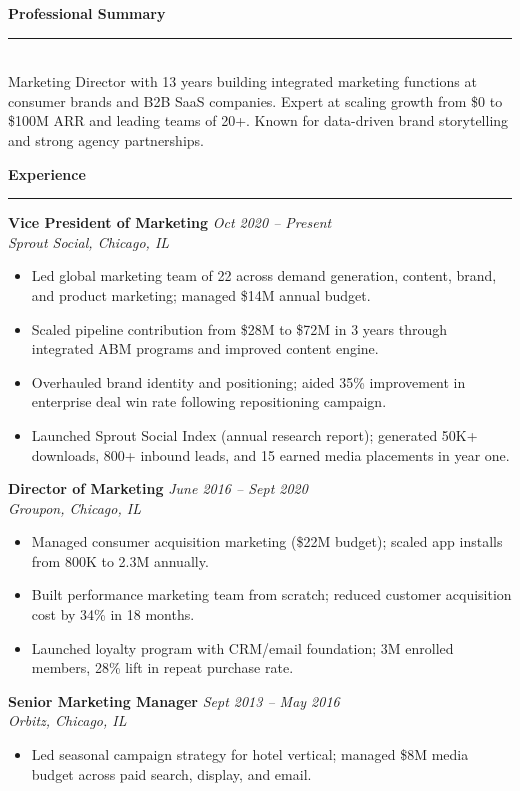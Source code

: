 \documentclass[11pt,a4paper]{article}
\begin{document}
\begin{minipage}[t]{0.62\textwidth}

\vspace{2pt}
{\large\textbf{Professional Summary}}\\
\rule{\linewidth}{0.4pt}\\[2pt]
\small
Marketing Director with 13 years building integrated marketing functions at consumer brands and B2B SaaS companies. Expert at scaling growth from \$0 to \$100M ARR and leading teams of 20+. Known for data-driven brand storytelling and strong agency partnerships.

\vspace{4pt}
{\large\textbf{Experience}}\\
\rule{\linewidth}{0.4pt}

\noindent\textbf{Vice President of Marketing} \hfill \textit{Oct 2020 -- Present}\\
\textit{Sprout Social, Chicago, IL}\small
\begin{itemize}
  \item Led global marketing team of 22 across demand generation, content, brand, and product marketing; managed \$14M annual budget.
  \item Scaled pipeline contribution from \$28M to \$72M in 3 years through integrated ABM programs and improved content engine.
  \item Overhauled brand identity and positioning; aided 35\% improvement in enterprise deal win rate following repositioning campaign.
  \item Launched Sprout Social Index (annual research report); generated 50K+ downloads, 800+ inbound leads, and 15 earned media placements in year one.
\end{itemize}

\vspace{4pt}
\noindent\textbf{Director of Marketing} \hfill \textit{June 2016 -- Sept 2020}\\
\textit{Groupon, Chicago, IL}\small
\begin{itemize}
  \item Managed consumer acquisition marketing (\$22M budget); scaled app installs from 800K to 2.3M annually.
  \item Built performance marketing team from scratch; reduced customer acquisition cost by 34\% in 18 months.
  \item Launched loyalty program with CRM/email foundation; 3M enrolled members, 28\% lift in repeat purchase rate.
\end{itemize}

\vspace{4pt}
\noindent\textbf{Senior Marketing Manager} \hfill \textit{Sept 2013 -- May 2016}\\
\textit{Orbitz, Chicago, IL}\small
\begin{itemize}
  \item Led seasonal campaign strategy for hotel vertical; managed \$8M media budget across paid search, display, and email.
\end{itemize}

\end{minipage}
\end{document}
